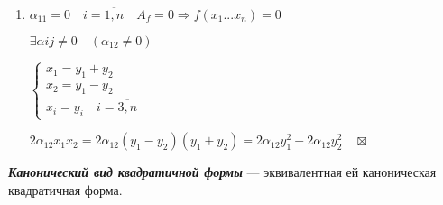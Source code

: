 \documentclass[a4paper, 12pt]{report}
\begin{document}
\begin{enumerate}
		$det \left( \begin{tabular}{c|c}
			\begin{tabular}{cc} \alpha_1_1(\lambda) \end{tabular} & \begin{matrix} \alpha_{12} \hspace{1.3 cm}  \dots & \hspace{1.3 cm} & \alpha_{1n} \end{matrix} \\ \hline \begin{matrix} 0 \\ \vdots \\ 0 \end{matrix} & \begin{matrix} S_{22} & \dots & S_{2n} \\ \vdots & \vdots & \vdots \\ S_{n2} & ... & S_{nn} \end{matrix} \end{tabular} \right)$ = $det$ $\left( \begin{tabular}{c|c}
			\begin{tabular}{cc} \alpha_{11} \end{tabular} & \alpha_{12}...\alpha_{1n}\\ \hline \begin{matrix} 0  \end{matrix} & S$ $\end{tabular} \right) =$
		
		$= \alpha_{11} detS \ne 0$
		\item $\alpha_{11} = 0 \quad i = \overline{1,n} \quad A_f = 0 \Longrightarrow f(x_1...x_n) = 0$
		
		$\exists \alpha{ij} \ne 0 \quad (\alpha_{12} \ne 0)$
		\par\bigskip
		$\begin{cases} x_1 = y_1 + y_2 \\ x_2 = y_1 - y_2 \\ x_i = y_i \quad i = \overline{3,n} \end{cases}$
		
		$2\alpha_{12} x_1 x_2 = 2\alpha_{12} (y_1 - y_2) (y_1 + y_2) = 2 \alpha_{12} y_1^2 - 2\alpha_{12} y_2^2 \quad \boxtimes$
	\end{enumerate}
	
	\textbf{\textit{Канонический вид квадратичной формы}} --- эквивалентная ей каноническая квадратичная форма.
	
	
	
\end{document}
